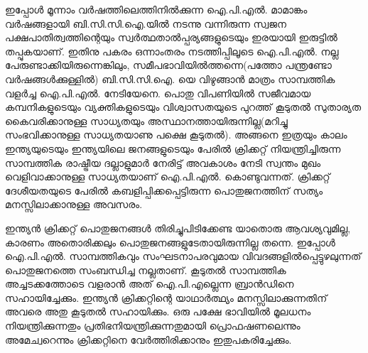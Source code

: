 ഇപ്പോള്‍ മൂന്നാം വര്‍ഷത്തിലെത്തിനില്‍ക്കുന്ന ഐ.പി.എല്‍. മാമാങ്കം വര്‍ഷങ്ങളായി ബി.സി.സി.ഐ.യില്‍ നടന്നു വന്നിരുന്ന സ്വജന പക്ഷപാതിത്വത്തിന്റെയും സ്വര്‍ത്ഥതാല്‍പ്പര്യങ്ങളുടെയും ഇരയായി ഇരുട്ടില്‍ തപ്പുകയാണ്. ഇതിനു പകരം ഒന്നാംതരം നടത്തിപ്പിലൂടെ ഐ.പി.എല്‍. നല്ല പേരുണ്ടാക്കിയിരുന്നെങ്കിലും, സമീപഭാവിയില്‍ത്തന്നെ(പത്തോ പന്ത്രണ്ടോ വര്‍ഷങ്ങള്‍ക്കുള്ളില്‍) ബി.സി.സി.ഐ. യെ വിഴുങ്ങാന്‍ മാത്രം സാമ്പത്തിക വളര്‍ച്ച ഐ.പി.എല്‍. നേടിയേനെ. പൊതു വിപണിയില്‍ സജീവമായ കമ്പനികളുടെയും വ്യക്തികളുടെയും വിശ്വാസതയുടെ പുറത്ത് കൂടുതല്‍ സുതാര്യത കൈവരിക്കാനുള്ള സാധ്യതയും അസ്ഥാനത്തായിരുന്നില്ല(മറിച്ചു സംഭവിക്കാനുള്ള സാധ്യതയാണു പക്ഷെ കൂടുതല്‍). അങ്ങനെ ഇത്രയും കാലം ഇന്ത്യയുടെയും ഇന്ത്യയിലെ ജനങ്ങളുടെയും പേരില്‍ ക്രിക്കറ്റ് നിയന്ത്രിച്ചിരുന്ന സാമ്പത്തിക രാഷ്ട്രീയ ദല്ലാളുമാര്‍ നേരിട്ട് അവകാശം നേടി സ്വന്തം മുഖം വെളിവാക്കാനുള്ള സാധ്യതയാണ് ഐ.പി.എല്‍. കൊണ്ടുവന്നത്. ക്രിക്കറ്റ് ദേശീയതയുടെ പേരില്‍ കബളിപ്പിക്കപ്പെട്ടിരുന്ന പൊതുജനത്തിന് സത്യം മനസ്സിലാക്കാനുള്ള അവസരം.

ഇന്ത്യന്‍ ക്രിക്കറ്റ് പൊതുജനങ്ങള്‍ തിരിച്ചുപിടിക്കേണ്ട യാതൊരു ആവശ്യവുമില്ല, കാരണം അതൊരിക്കലും പൊതുജനങ്ങളുടേതായിരുന്നില്ല തന്നെ. ഇപ്പോള്‍ ഐ.പി.എല്‍. സാമ്പത്തികവും സംഘടനാപരവുമായ വിവദങ്ങളില്‍പ്പെട്ടുഴലുന്നത് പൊതുജനത്തെ സംബന്ധിച്ച നല്ലതാണ്. കൂടുതല്‍ സാമ്പത്തിക അച്ചടക്കത്തോടെ വളരാന്‍ അത് ഐ.പി.എല്ലെന്ന ബ്രാന്‍ഡിനെ സഹായിച്ചേക്കും. ഇന്ത്യന്‍ ക്രിക്കറ്റിന്റെ യാഥാര്‍ത്ഥ്യം മനസ്സിലാക്കുന്നതിന് അവരെ അതു കൂടുതല്‍ സഹായിക്കും. ഒരു പക്ഷേ ഭാവിയില്‍ മൂലധനം നിയന്ത്രിക്കുന്നതും പ്രതിഭനിയന്ത്രിക്കുന്നതുമായി പ്രൊഫഷണലെന്നും അമേച്വറെന്നും ക്രിക്കറ്റിനെ വേര്‍ത്തിരിക്കാനും ഇതുപകരിച്ചേക്കും.
\newpage
